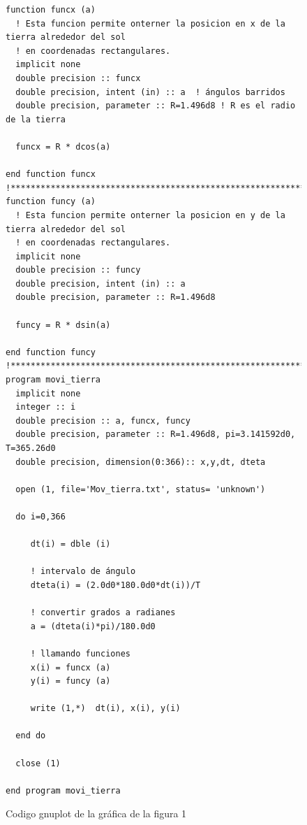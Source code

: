 \documentclass[12pt,a4paper,twoside]{article}
\begin{document}
\begin{figure}[h]
\begin{verbatim}
function funcx (a)
  ! Esta funcion permite onterner la posicion en x de la tierra alrededor del sol
  ! en coordenadas rectangulares.
  implicit none 
  double precision :: funcx
  double precision, intent (in) :: a  ! ángulos barridos 
  double precision, parameter :: R=1.496d8 ! R es el radio de la tierra 
  
  funcx = R * dcos(a)
  
end function funcx
!***********************************************************************************
function funcy (a)
  ! Esta funcion permite onterner la posicion en y de la tierra alrededor del sol
  ! en coordenadas rectangulares.
  implicit none 
  double precision :: funcy
  double precision, intent (in) :: a
  double precision, parameter :: R=1.496d8
  
  funcy = R * dsin(a)
  
end function funcy
!************************************************************************************
program movi_tierra
  implicit none
  integer :: i
  double precision :: a, funcx, funcy
  double precision, parameter :: R=1.496d8, pi=3.141592d0, T=365.26d0
  double precision, dimension(0:366):: x,y,dt, dteta

  open (1, file='Mov_tierra.txt', status= 'unknown')

  do i=0,366
     
     dt(i) = dble (i)
     
     ! intervalo de ángulo
     dteta(i) = (2.0d0*180.0d0*dt(i))/T
     
     ! convertir grados a radianes
     a = (dteta(i)*pi)/180.0d0

     ! llamando funciones
     x(i) = funcx (a)
     y(i) = funcy (a)

     write (1,*)  dt(i), x(i), y(i)

  end do

  close (1)

end program movi_tierra
\end{verbatim}
\caption{Codigo gnuplot de la gráfica de la figura 1}
\label{fig:figura3}
\end{figure}
\end{document}
